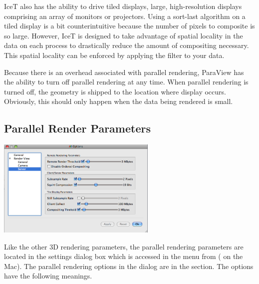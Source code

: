 IceT also has the ability to drive tiled displays, large, high-resolution
displays comprising an array of monitors or projectors.  Using a sort-last
algorithm on a tiled display is a bit counterintuitive because the number
of pixels to composite is so large.  However, IceT is designed to take
advantage of spatial locality in the data on each process to drastically
reduce the amount of compositing necessary.  This spatial locality can be
enforced by applying the  filter to your data.

Because there is an overhead associated with parallel rendering, ParaView
has the ability to turn off parallel rendering at any time.  When parallel
rendering is turned off, the geometry is shipped to the location where
display occurs.  Obviously, this should only happen when the data being
rendered is small.

\subsection{Parallel Render Parameters}

\begin{inlinefig}
  \includegraphics[width=3in]{images/SettingsServer}
\end{inlinefig}

Like the other 3D rendering parameters, the parallel rendering parameters
are located in the settings dialog box which is accessed in the menu from
 \ra {} ( \ra {} on the
Mac).  The parallel rendering options in the dialog are in the  \ra {} section.  The options have the following meanings.


